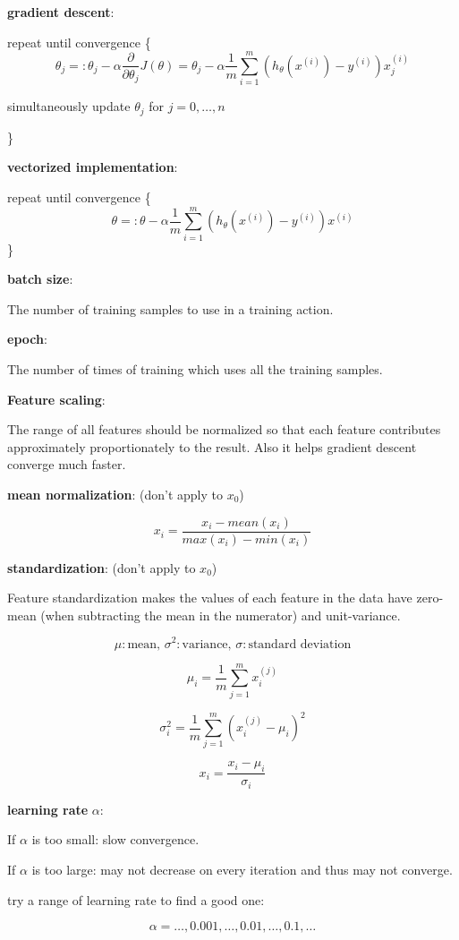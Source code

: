 \documentclass{article}
\begin{document}
\textbf{gradient descent}:

repeat until convergence \{
\[\theta_j =: \theta_j - \alpha \frac{\partial}{\partial \theta_j} J(\theta) = \theta_j - \alpha \frac{1}{m} \sum_{i = 1}^m (h_{\theta}(x^{(i)}) - y^{(i)}) x^{(i)}_j\]
\centerline{simultaneously update \(\theta_j\) for \(j = 0, \dots, n\)}
\}

\textbf{vectorized implementation}:

repeat until convergence \{
\[\theta =: \theta - \alpha \frac{1}{m} \sum_{i = 1}^m (h_{\theta}(x^{(i)}) - y^{(i)}) x^{(i)}\]
\}

\textbf{batch size}:

The number of training samples to use in a training action.

\textbf{epoch}:

The number of times of training which uses all the training samples.

\textbf{Feature scaling}:

The range of all features should be normalized so that each feature contributes approximately proportionately to the result. Also it helps gradient descent converge much faster.

\textbf{mean normalization}: (don't apply to \(x_0\))

\[x_i = \frac{x_i - mean(x_i)}{max(x_i) - min(x_i)}\]

\textbf{standardization}: (don't apply to \(x_0\))

Feature standardization makes the values of each feature in the data have zero-mean (when subtracting the mean in the numerator) and unit-variance.

\[\mu: \text{mean, } \sigma^2: \text{variance, } \sigma: \text{standard deviation}\]

\[\mu_i ={\frac {1}{m}}\sum _{j=1}^{m}x^{(j)}_{i}\]

\[\sigma^2_i = \frac{1}{m} \sum_{j = 1}^m (x^{(j)}_i - \mu_i)^2\]

\[x_i = \frac{x_i - \mu_i}{\sigma_i}\]

\textbf{learning rate} \(\alpha\):

If \(\alpha\) is too small: slow convergence.

If \(\alpha\) is too large: may not decrease on every iteration and thus may not converge.

try a range of learning rate to find a good one:

\[\alpha = \dots, 0.001, \dots, 0.01, \dots, 0.1, \dots\]
\end{document}
